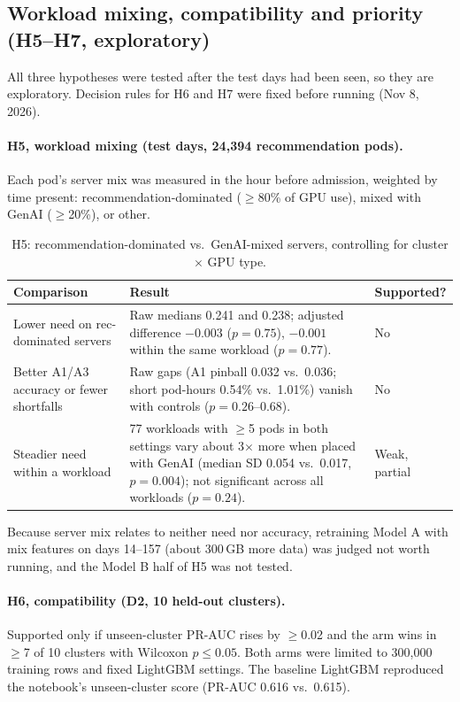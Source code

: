 \subsection{Workload mixing, compatibility and priority (H5--H7, exploratory)}
\label{sec:mixing}

All three hypotheses were tested after the test days had been seen, so they are exploratory. Decision rules for H6 and H7 were fixed before running (Nov 8, 2026).

\paragraph{H5, workload mixing (test days, 24{,}394 recommendation pods).} Each pod's server mix was measured in the hour before admission, weighted by time present: recommendation-dominated ($\ge$80\% of GPU use), mixed with GenAI ($\ge$20\%), or other.

\begin{table}[H]
\centering\small
\caption{H5: recommendation-dominated vs.\ GenAI-mixed servers, controlling for cluster $\times$ GPU type.}
\label{tab:h5}
\begin{tabularx}{\linewidth}{@{}p{4.3cm}Lp{1.5cm}@{}}
\toprule
Comparison & Result & Supported? \\
\midrule
Lower need on rec-dominated servers & Raw medians 0.241 and 0.238; adjusted difference $-0.003$ ($p = 0.75$), $-0.001$ within the same workload ($p = 0.77$). & No \\
Better A1/A3 accuracy or fewer shortfalls & Raw gaps (A1 pinball 0.032 vs.\ 0.036; short pod-hours 0.54\% vs.\ 1.01\%) vanish with controls ($p = 0.26$--$0.68$). & No \\
Steadier need within a workload & 77 workloads with $\ge$5 pods in both settings vary about 3$\times$ more when placed with GenAI (median SD 0.054 vs.\ 0.017, $p = 0.004$); not significant across all workloads ($p = 0.24$). & Weak, partial \\
\bottomrule
\end{tabularx}
\end{table}

\noindent Because server mix relates to neither need nor accuracy, retraining Model A with mix features on days 14--157 (about 300\,GB more data) was judged not worth running, and the Model B half of H5 was not tested.

\paragraph{H6, compatibility (D2, 10 held-out clusters).} Supported only if unseen-cluster PR-AUC rises by $\ge$0.02 and the arm wins in $\ge$7 of 10 clusters with Wilcoxon $p \le 0.05$. Both arms were limited to 300{,}000 training rows and fixed LightGBM settings. The baseline LightGBM reproduced the notebook's unseen-cluster score (PR-AUC 0.616 vs.\ 0.615).

